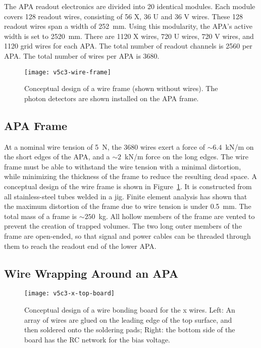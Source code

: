 The APA readout electronics are divided into 20 identical modules.  Each module covers 128
readout wires, consisting of 56 X, 36 U and 36 V wires. These 128 readout wires span a width 
of 252~mm.  Using this modularity, the APA's active width is set to 2520~mm. 
There are 1120 X wires, 720 U wires, 720 V wires, and 1120 grid 
wires for each APA.  The total number of readout channels is 2560 per APA. 
The total number of wires per APA is 3680.



\begin{figure}[htpb]
\centering
\texttt{[image: v5c3-wire-frame]}
\caption[Conceptual design of a wire frame]{Conceptual design of a wire frame (shown without wires). The photon detectors are shown installed on the APA frame. }
\label{fig:tpc-wire-frame}
\end{figure}

\subsection{APA Frame}

At a nominal wire tension of 5~N, the 3680 wires exert a force of 
$\sim 6.4$~kN/m on the short edges of the APA, and a 
$\sim 2 $~kN/m force on the long edges. The wire 
frame must be able to withstand the wire tension with a minimal 
distortion, while minimizing the thickness of the 
frame to reduce the resulting dead space. A conceptual design 
of the wire frame is shown in Figure~\ref{fig:tpc-wire-frame}.  
It is constructed from all stainless-steel tubes welded in a jig.  Finite element analysis has shown that the maximum distortion of the frame due to wire tension is under 0.5~mm.
The total mass of a frame is $\sim 250$~kg.  All hollow members 
of the frame are vented to prevent the creation of trapped volumes.
The two long outer members of the frame are open-ended, so that signal 
and power cables can be threaded through them to reach the readout 
end of the lower APA.  

\subsection{Wire Wrapping Around an APA}


\begin{figure}[htpb]
\centering
\texttt{[image: v5c3-x-top-board]}
\caption[Conceptual design of a wire bonding board for the x wires]{Conceptual design of a wire bonding board for the x wires. Left: An array of wires are glued on the leading edge of the top surface, and then soldered onto the soldering pads; Right: the bottom side of the board has the RC network for the bias voltage. }
\label{fig:tpc-wire-board-x}
\end{figure}


